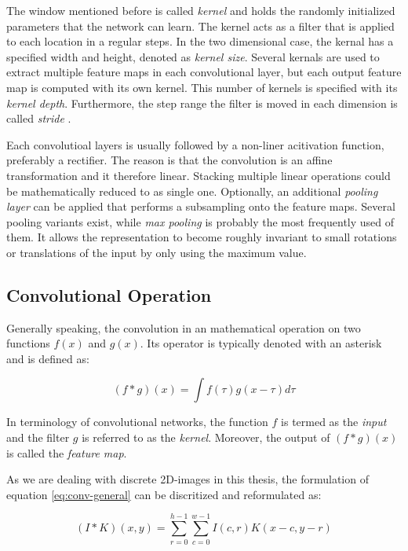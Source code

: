 The window mentioned before is called \textit{kernel} and holds the randomly initialized parameters that the network can learn. The kernel acts as a filter that is applied to each location in a regular steps. In the two dimensional case, the kernal has a specified width and height, denoted as \textit{kernel size}. Several kernals are used to extract multiple feature maps in each convolutional layer, but each output feature map is computed with its own kernel. This number of kernels is specified with its \textit{kernel depth}. Furthermore, the step range the filter is moved in each dimension is called \textit{stride} \parencite{conv_guide}.

Each convolutioal layers is usually followed by a non-liner acitivation function, preferably a rectifier. The reason is that the convolution is an affine transformation and it therefore linear. Stacking multiple linear operations could be mathematically reduced to as single one. Optionally, an additional \textit{pooling layer} can be applied that performs a subsampling onto the feature maps. Several pooling variants exist, while \textit{max pooling} is probably the most frequently used of them. It allows the representation to become roughly invariant to small rotations or translations of the input \parencite[p. 343]{deep_learning} by only using the maximum value.


\subsection{Convolutional Operation} \label{sec:conv-op}

Generally speaking, the convolution in an mathematical operation on two functions $f(x)$ and $g(x)$. Its operator is typically denoted with an asterisk \parencite[p. 332]{deep_learning} and is defined as:

\begin{equation} \label{eq:conv-general}
  (f \ast g)(x) = \int f(\tau)g(x-\tau) d\tau
\end{equation}

In terminology of convolutional networks, the function $f$ is termed as the \textit{input} and the filter $g$ is referred to as the \textit{kernel}. Moreover, the output of $ (f \ast g)(x) $ is called the \textit{feature map}.

As we are dealing with discrete 2D-images in this thesis, the formulation of equation \ref{eq:conv-general} can be discritized and reformulated as:

\begin{equation} \label{eq:conv-2d}
  (I \ast K)(x,y) = \sum\limits_{r=0}^{h-1} \sum\limits_{c=0}^{w-1} I(c,r)K(x-c,y-r)
\end{equation}

